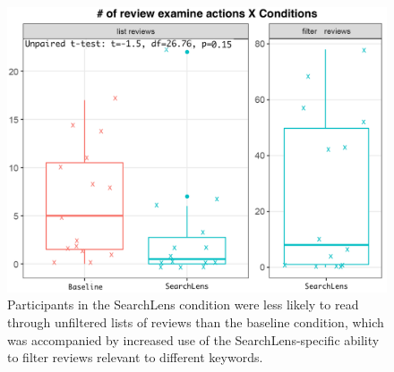 






\begin{figure}
    \centering
    \includegraphics[height=0.45\columnwidth]{Chapters/SearchLens/figures/reviews.png}
    \caption[Participants frequently interactive with their Lenses instead of sift through reviews]{Participants in the SearchLens condition were less likely to read through unfiltered lists of reviews than the baseline condition, which was accompanied by increased use of the SearchLens-specific ability to filter reviews relevant to different keywords.}
    \label{fig:sl_reviews}
\end{figure}




